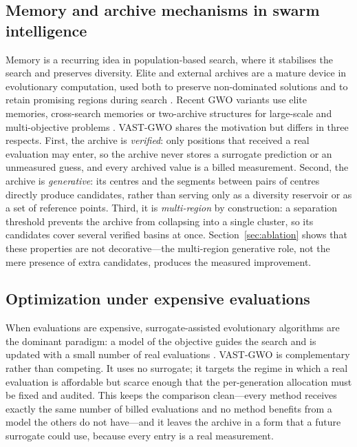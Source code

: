 \documentclass[11pt,a4paper]{article}
\newcommand{\method}{VAST-GWO}
\begin{document}
\subsection{Memory and archive mechanisms in swarm intelligence}
Memory is a recurring idea in population-based search, where it stabilises the
search and preserves diversity. Elite and external archives are a mature device in evolutionary computation,
used both to preserve non-dominated solutions \citep{deb2002nsga2} and to
retain promising regions during search \citep{zhang2009jade,sun2024niching,hong2024elite}.
Recent GWO variants use elite memories, cross-search memories or two-archive
structures for large-scale and multi-objective problems
\citep{zamani2026egwo,tejani2025twoarchive}. \method{}
shares the motivation but differs in three respects. First, the archive is
\emph{verified}: only positions that received a real evaluation may enter, so
the archive never stores a surrogate prediction or an unmeasured guess, and
every archived value is a billed measurement. Second, the archive is
\emph{generative}: its centres and the segments between pairs of centres
directly produce candidates, rather than serving only as a diversity reservoir
or as a set of reference points. Third, it is \emph{multi-region} by
construction: a separation threshold prevents the archive from collapsing into
a single cluster, so its candidates cover several verified basins at once.
Section~\ref{sec:ablation} shows that these properties are not decorative---the
multi-region generative role, not the mere presence of extra candidates,
produces the measured improvement.

\subsection{Optimization under expensive evaluations}
When evaluations are expensive, surrogate-assisted evolutionary algorithms are
the dominant paradigm: a model of the objective guides the search and is
updated with a small number of real evaluations
\citep{jones1998ego,jin2003fitness,jin2011surrogate,yu2021multimodel,liu2024survey,zhao2025surrogate}. \method{} is
complementary rather than competing. It uses no surrogate; it targets the
regime in which a real evaluation is affordable but scarce enough that the
per-generation allocation must be fixed and audited. This keeps the comparison
clean---every method receives exactly the same number of billed evaluations and
no method benefits from a model the others do not have---and it leaves the
archive in a form that a future surrogate could use, because every entry is a
real measurement.
\end{document}
